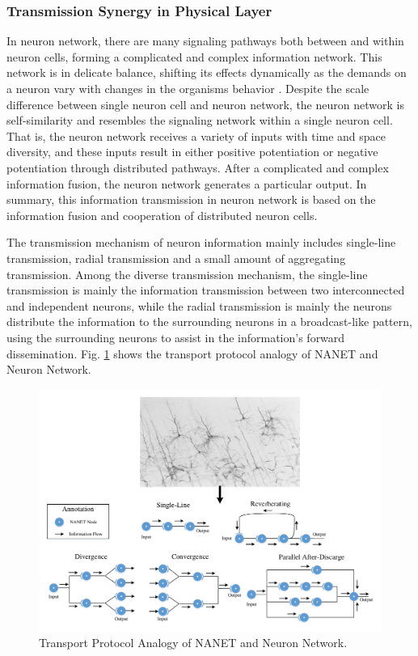 \documentclass[journal,comsoc]{IEEEtran}
\begin{document}
	\subsubsection{Transmission Synergy in Physical Layer}
	In neuron network, there are many signaling pathways both between and within neuron cells, forming a complicated and complex information network. 
	This network is in delicate balance, shifting its effects dynamically as the demands on a neuron vary with changes in the organisms behavior \cite{bear2007neuroscience} .
	Despite the scale difference between single neuron cell and neuron network, the neuron network is self-similarity and resembles the signaling network within a single neuron cell. 
	That is, the neuron network receives a variety of inputs with time and space diversity, and these inputs result in either positive potentiation or negative potentiation through distributed pathways. 
	After a complicated and complex information fusion, the neuron network generates a particular output. 
	In summary, this information transmission in neuron network is based on the information fusion and cooperation of distributed neuron cells.
	
	The transmission mechanism of neuron information mainly includes single-line transmission, radial transmission and a small amount of aggregating transmission.
	Among the diverse transmission mechanism, the single-line transmission is mainly the information transmission between two interconnected and independent neurons, while the radial transmission is mainly the neurons distribute the information to the surrounding neurons in a broadcast-like pattern, using the surrounding neurons to assist in the information's forward dissemination.
	Fig. \ref{fig: transport_pro} shows the transport protocol analogy of NANET and Neuron Network.
	\begin{figure}[htbp]
		\centering
		\includegraphics[width=0.9\linewidth]{figures/tran_protocol.pdf}
		\caption{Transport Protocol Analogy of NANET and Neuron Network.}	
		\label{fig: transport_pro}
	\end{figure}
	
\end{document}
